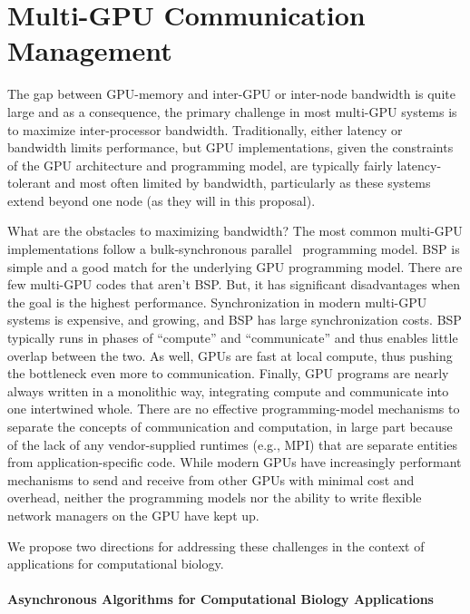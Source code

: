 
\section{Multi-GPU Communication Management}
\label{sec:multigpu}

The gap between GPU-memory and inter-GPU or inter-node bandwidth is quite large and as a consequence, the primary challenge in most multi-GPU systems is to maximize inter-processor bandwidth. Traditionally, either latency or bandwidth limits performance, but GPU implementations, given the constraints of the GPU architecture and programming model, are typically fairly latency-tolerant and most often limited by bandwidth, particularly as these systems extend beyond one node (as they will in this proposal). %

What are the obstacles to maximizing bandwidth? The most common multi-GPU implementations follow a bulk-synchronous parallel~\cite{Valiant:1990:ABM} programming model. BSP is simple and a good match for the underlying GPU programming model. There are few multi-GPU codes that aren't BSP\@. But, it has significant disadvantages when the goal is the highest performance. Synchronization in modern multi-GPU systems is expensive, and growing, and BSP has large synchronization costs. BSP typically runs in phases of ``compute'' and ``communicate'' and thus enables little overlap between the two. As well, GPUs are fast at local compute, thus pushing the bottleneck even more to communication. Finally, GPU programs are nearly always written in a  monolithic way, integrating compute and communicate into one intertwined whole. There are no effective programming-model mechanisms to separate the concepts of communication and computation, in large part because of the lack of any vendor-supplied runtimes (e.g., MPI) that are separate entities from application-specific code. While modern GPUs have increasingly performant mechanisms to send and receive from other GPUs with minimal cost and overhead, neither the programming models nor the ability to write flexible network managers on the GPU have kept up.

We propose two directions for addressing these challenges in the context of applications for computational biology.

\paragraph{Asynchronous Algorithms for Computational Biology Applications}

